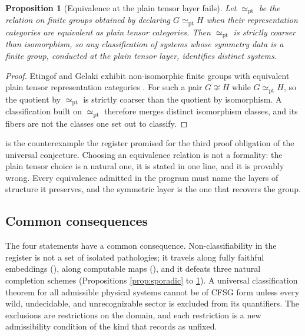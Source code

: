 \documentclass[11pt,letterpaper]{article}
\newtheorem{proposition}[theorem]{Proposition}
\theoremstyle{definition}
\theoremstyle{remark}
\begin{document}
\begin{proposition}[Equivalence at the plain tensor layer fails]
\label{prop:equiv}
Let $\simeq_{\mathrm{pt}}$ be the relation on finite groups obtained by declaring $G \simeq_{\mathrm{pt}} H$ when their representation categories are equivalent as plain tensor categories. Then $\simeq_{\mathrm{pt}}$ is strictly coarser than isomorphism, so any classification of systems whose symmetry data is a finite group, conducted at the plain tensor layer, identifies distinct systems.
\end{proposition}

\begin{proof}
Etingof and Gelaki exhibit non-isomorphic finite groups with equivalent plain tensor representation categories \cite{eg2000}. For such a pair $G \not\cong H$ while $G \simeq_{\mathrm{pt}} H$, so the quotient by $\simeq_{\mathrm{pt}}$ is strictly coarser than the quotient by isomorphism. A classification built on $\simeq_{\mathrm{pt}}$ therefore merges distinct isomorphism classes, and its fibers are not the classes one set out to classify.
\end{proof}

 is the counterexample the register promised for the third proof obligation of the universal conjecture. Choosing an equivalence relation is not a formality: the plain tensor choice is a natural one, it is stated in one line, and it is provably wrong. Every equivalence admitted in the program must name the layers of structure it preserves, and the symmetric layer is the one that recovers the group.

\subsection{Common consequences}

The four statements have a common consequence. Non-classifiability in the register is not a set of isolated pathologies; it travels along fully faithful embeddings (), along computable maps (), and it defeats three natural completion schemes (Propositions \ref{prop:sporadic} to \ref{prop:equiv}). A universal classification theorem for all admissible physical systems cannot be of CFSG form unless every wild, undecidable, and unrecognizable sector is excluded from its quantifiers. The exclusions are restrictions on the domain, and each restriction is a new admissibility condition of the kind that  records as unfixed.
\end{document}
